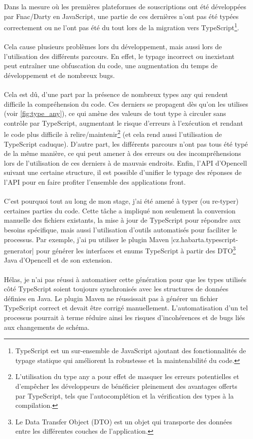 \documentclass[12pt, a4paper]{report}
\begin{document}
	Dans la mesure où les premières plateformes de souscriptions ont été développées par Fnac/Darty en JavaScript, une partie de ces dernières n'ont pas été typées correctement ou ne l'ont pas été du tout lors de la migration vers TypeScript\footnote{TypeScript est un sur-ensemble de JavaScript ajoutant des fonctionnalités de typage statique qui améliorent la robustesse et la maintenabilité du code.}. 
	\\\\
	Cela cause plusieurs problèmes lors du développement, mais aussi lors de l'utilisation des différents parcours. En effet, le typage incorrect ou inexistant peut entraîner une obfuscation du code, une augmentation du temps de développement et de nombreux bugs. 
	\\\\
	Cela est dû, d'une part par la présence de nombreux types \flqq{} any \frqq{} qui rendent difficile la compréhension du code. Ces derniers se propagent dès qu'on les utilises (voir \ref{fig:type_any}),	ce qui amène des valeurs de tout type à circuler sans contrôle par TypeScript, augmentant le risque d'erreurs à l'exécution et rendant le code plus difficile à relire/maintenir\footnote{L'utilisation du type \flqq{} any \frqq{} a pour effet de masquer les erreurs potentielles et d'empêcher les développeurs de bénéficier pleinement des avantages offerts par TypeScript, tels que l'autocomplétion et la vérification des types à la compilation.} (et cela rend aussi l'utilisation de TypeScript caduque). D'autre part, les différents parcours n'ont pas tous été typé de la même manière, ce qui peut amener à des erreurs ou des incompréhensions lors de l'utilisation de ces derniers à de mauvais endroits. Enfin, l'API d'Opencell suivant une certaine structure, il est possible d'unifier le typage des réponses de l'API pour en faire profiter l'ensemble des applications front.
	\\\\
	C'est pourquoi tout au long de mon stage, j'ai été amené à typer (ou re-typer) certaines parties du code. Cette tâche a impliqué non seulement la conversion manuelle des fichiers existants, la mise à jour de TypeScript pour répondre aux besoins spécifique, mais aussi l'utilisation d'outils automatisés pour faciliter le processus. Par exemple, j'ai pu utiliser le plugin Maven \cverb|cz.habarta.typescript-generator| pour générer les interfaces et enums TypeScript à partir des DTO\footnote{Le Data Transfer Object (DTO) est un objet qui transporte des données entre les différentes couches de l'application.} Java d'Opencell et de son extension. 
	\\\\
	Hélas, je n'ai pas réussi à automatiser cette génération pour que les types utilisés côté TypeScript soient toujours synchronisés avec les structures de données définies en Java. Le plugin Maven ne réussissait pas à générer un fichier TypeScript correct et devait être corrigé manuellement. L'automatisation d'un tel processus pourrait à terme réduire ainsi les risques d'incohérences et de bugs liés aux changements de schéma.
\end{document}
